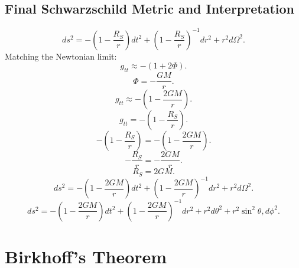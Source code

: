 \documentclass[11pt, a4paper]{report}
\begin{document}
\subsection{Final Schwarzschild Metric and Interpretation}
\begin{equation}
ds^2 = -\left( 1 - \frac{R_S}{r} \right) dt^2 + \left( 1 - \frac{R_S}{r} \right)^{-1} dr^2 + r^2 d\Omega^2.
\end{equation}
Matching the Newtonian limit:
\begin{equation}
g_{tt} \approx -(1 + 2\Phi).
\end{equation}
\begin{equation}
\Phi = -\frac{GM}{r}.
\end{equation}
\begin{equation}
g_{tt} \approx -\left( 1 - \frac{2GM}{r} \right).
\end{equation}
\begin{equation}
g_{tt} = -\left( 1 - \frac{R_S}{r} \right).
\end{equation}
\begin{equation}
-\left( 1 - \frac{R_S}{r} \right) = -\left( 1 - \frac{2GM}{r} \right).
\end{equation}
\begin{equation}
-\frac{R_S}{r} = -\frac{2GM}{r}.
\end{equation}
\begin{equation}
R_S = 2GM.
\end{equation}
\begin{equation}
ds^2 = -\left( 1 - \frac{2GM}{r} \right) dt^2 + \left( 1 - \frac{2GM}{r} \right)^{-1} dr^2 + r^2 d\Omega^2.
\end{equation}
\begin{equation}
ds^2 = -\left( 1 - \frac{2GM}{r} \right) dt^2 + \left( 1 - \frac{2GM}{r} \right)^{-1} dr^2 + r^2 d\theta^2 + r^2 \sin^2\theta , d\phi^2.
\end{equation}

\section{Birkhoff's Theorem}
\end{document}
